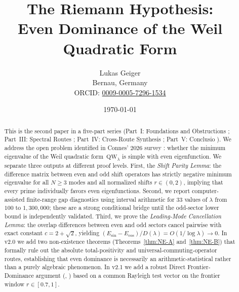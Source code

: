 \documentclass[12pt,a4paper]{article}
\title{The Riemann Hypothesis:\\ Even Dominance of the Weil Quadratic Form}
\author{Lukas Geiger\\
\small Bernau, Germany\\
\small ORCID: \href{https://orcid.org/0009-0005-7296-1534}{0009-0005-7296-1534}}
\date{\today}
\theoremstyle{definition}
\theoremstyle{remark}
\begin{document}
\overfullrule=0pt
\maketitle

\begin{abstract}\footnotesize
This is the second paper in a five-part series (Part~I: Foundations and Obstructions \cite{Geiger2026partI}; Part~III: Spectral Routes \cite{Geiger2026partIII}; Part~IV: Cross-Route Synthesis \cite{Geiger2026partIV}; Part~V: Conclusio \cite{Geiger2026partV}). We address the open problem identified in Connes' 2026 survey \cite{Connes2026}: whether the minimum eigenvalue of the Weil quadratic form~$\mathrm{QW}_\lambda$ is simple with even eigenfunction. We separate three outputs at different proof levels. First, the \emph{Shift Parity Lemma}: the difference matrix between even and odd shift operators has strictly negative minimum eigenvalue for all $N \geq 3$ modes and all normalized shifts $r \in (0,2)$, implying that every prime individually favors even eigenfunctions. Second, we report computer-assisted finite-range gap diagnostics using interval arithmetic for $33$ values of $\lambda$ from $100$ to $1{,}300{,}000$; these are a strong conditional bridge until the odd-sector lower bound is independently validated. Third, we prove the \emph{Leading-Mode Cancellation Lemma}: the overlap differences between even and odd sectors cancel pairwise with exact constant $c = 2 + \sqrt{2}$, yielding $(E_{\sin} - E_{\cos})/D(\lambda) = O(1/\log\lambda) \to 0$. In v2.0 we add two non-existence theorems (Theorems~\ref{thm:NE-A} and~\ref{thm:NE-B}) that formally rule out the absolute total-positivity and universal-commuting-operator routes, establishing that even dominance is necessarily an arithmetic-statistical rather than a purely algebraic phenomenon. In v2.1 we add a robust Direct Frontier-Dominance argument (, ) based on a common Rayleigh test vector on the frontier window $r \in [0.7,1]$.


\end{abstract}
\end{document}

